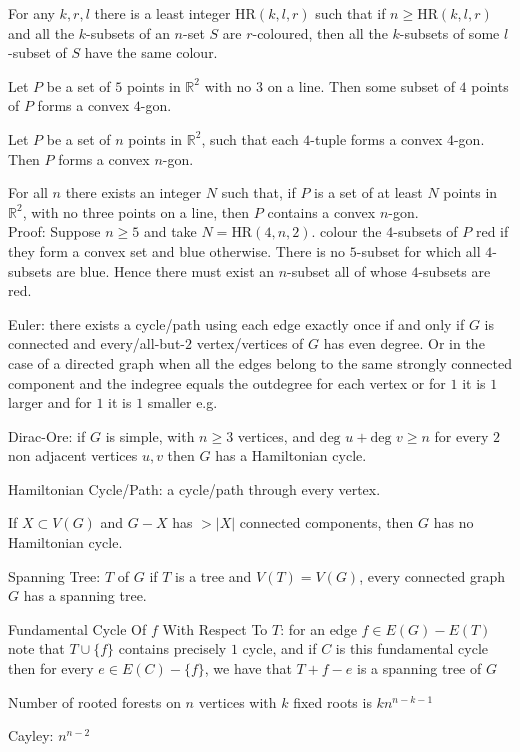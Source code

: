 For any $k,r,l$ there is a least integer $\text{HR}(k,l,r)$ such that if $n \ge \text{HR}(k,l,r)$ and all the $k$-subsets of an $n$-set $S$ are $r$-coloured, then all the $k$-subsets of some $l$-subset of $S$ have the same colour.

Let $P$ be a set of $5$ points in $\mathbb{R}^2$ with no $3$ on a line. Then some subset of $4$ points of $P$ forms a convex $4$-gon.

Let $P$ be a set of $n$ points in $\mathbb{R}^2$, such that each $4$-tuple forms a convex $4$-gon. Then $P$ forms a convex $n$-gon.

For all $n$ there exists an integer $N$ such that, if $P$ is a set of at least $N$ points in $\mathbb{R}^2$, with no three points on a line, then $P$ contains a convex $n$-gon. \\
Proof: Suppose $n \ge 5$ and take $N = \text{HR}(4,n,2)$. colour the $4$-subsets of $P$ red if they form a convex set and blue otherwise. There is no $5$-subset for which all $4$-subsets are blue. Hence there must exist an $n$-subset all of whose $4$-subsets are red.

Euler: there exists a cycle/path using each edge exactly once if and only if $G$ is connected and every/all-but-$2$ vertex/vertices of $G$ has even degree. Or in the case of a directed graph when all the edges belong to the same strongly connected component and the indegree equals the outdegree for each vertex or for $1$ it is $1$ larger and for $1$ it is $1$ smaller e.g.

Dirac-Ore: if $G$ is simple, with $n \ge 3$ vertices, and $\text{deg }u+\text{deg }v \ge n$ for every $2$ non adjacent vertices $u,v$ then $G$ has a Hamiltonian cycle.

Hamiltonian Cycle/Path: a cycle/path through every vertex.

If $X \subset V(G)$ and $G-X$ has $> |X|$ connected components, then $G$ has no Hamiltonian cycle.

Spanning Tree: $T$ of $G$ if $T$ is a tree and $V(T)=V(G)$, every connected graph $G$ has a spanning tree.

Fundamental Cycle Of $f$ With Respect To $T$: for an edge $f \in E(G)-E(T)$ note that $T \cup \{f \}$ contains precisely $1$ cycle, and if $C$ is this fundamental cycle then for every $e \in E(C) - \{ f \}$, we have that $T+f-e$ is a spanning tree of $G$

Number of rooted forests on $n$ vertices with $k$ fixed roots is $kn^{n-k-1}$

Cayley: $n^{n-2}$

